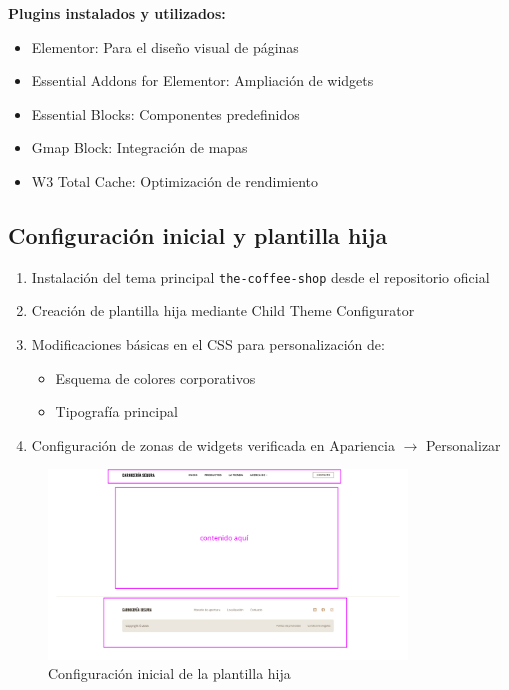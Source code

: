 \documentclass[a4paper]{article}
\begin{document}
\textbf{Plugins instalados y utilizados:}
\begin{itemize}
    \item Elementor: Para el diseño visual de páginas
    \item Essential Addons for Elementor: Ampliación de widgets
    \item Essential Blocks: Componentes predefinidos
    \item Gmap Block: Integración de mapas
    \item W3 Total Cache: Optimización de rendimiento
\end{itemize}

\subsection{Configuración inicial y plantilla hija}
\begin{enumerate}
    \item Instalación del tema principal \texttt{the-coffee-shop} desde el repositorio oficial
    \item Creación de plantilla hija mediante Child Theme Configurator
    \item Modificaciones básicas en el CSS para personalización de:
    \begin{itemize}
        \item Esquema de colores corporativos
        \item Tipografía principal
    \end{itemize}
    \item Configuración de zonas de widgets verificada en Apariencia $\rightarrow$ Personalizar
\end{enumerate}

\begin{figure}[H]
    \centering
    \includegraphics[width=0.85\textwidth]{images/template.png}
    \caption{Configuración inicial de la plantilla hija}
\end{figure}
\end{document}
